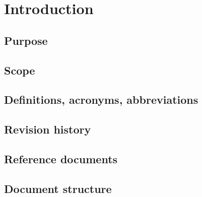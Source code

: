 \chapter{Introduction}

\section{Purpose}
\section{Scope}
\section{Definitions, acronyms, abbreviations}
\section{Revision history}
\section{Reference documents}
\section{Document structure}